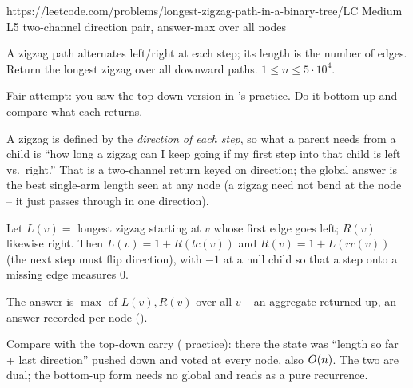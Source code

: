   {https://leetcode.com/problems/longest-zigzag-path-in-a-binary-tree/}{LC Medium L5}
  {two-channel direction pair, answer-max over all nodes}

\begin{problemstatement}
A zigzag path alternates left/right at each step; its length is the number of
edges. Return the longest zigzag over all downward paths. $1 \le n \le 5\cdot10^{4}$.
\end{problemstatement}

\begin{attemptgate}
Fair attempt: you saw the top-down version in 's practice.
Do it bottom-up and compare what each returns.
\end{attemptgate}

A zigzag is defined by the \emph{direction of each step}, so what a parent needs
from a child is ``how long a zigzag can I keep going if my first step into that
child is left vs.\ right.'' That is a two-channel return keyed on direction; the
global answer is the best single-arm length seen at any node (a zigzag need not
bend at the node -- it just passes through in one direction).

\begin{observation}
Let $L(v)=$ longest zigzag starting at $v$ whose first edge goes left;
$R(v)$ likewise right. Then $L(v)=1+R(\mathit{lc}(v))$ and
$R(v)=1+L(\mathit{rc}(v))$ (the next step must flip direction), with $-1$ at a
null child so that a step onto a missing edge measures $0$.
\end{observation}
\begin{observation}
The answer is $\max$ of $L(v),R(v)$ over all $v$ -- an aggregate returned up, an
answer recorded per node ().
\end{observation}
\begin{observation}
Compare with the top-down carry ( practice): there the state
was ``length so far + last direction'' pushed down and voted at every node, also
$O(n)$. The two are dual; the bottom-up form needs no global and reads as a
pure recurrence.
\end{observation}

